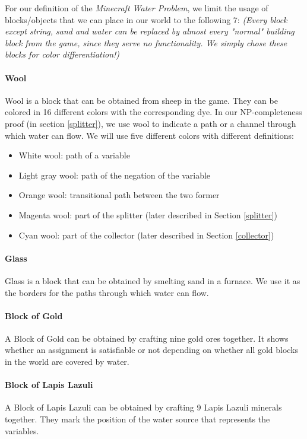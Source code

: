 \noindent For our definition of the \textit{Minecraft Water Problem}, we limit the usage of blocks/objects that we can place in our world to the following 7:
\newline \textit{(Every block except string, sand and water can be replaced by almost every "normal" building block from the game, since they serve no functionality. We simply chose these blocks for color differentiation!)}
\paragraph{Wool\cite{minecraftfandom:wool}}
Wool is a block that can be obtained from sheep in the game.
They can be colored in 16 different colors with the corresponding dye.
In our NP-completeness proof (in section \ref{splitter}), we use wool to indicate a path or a channel through which water can flow.
We will use five different colors with different definitions:
\begin{itemize}
    \item White wool: path of a variable
    \item Light gray wool: path of the negation of the variable
    \item Orange wool: transitional path between the two former
    \item Magenta wool: part of the splitter (later described in Section \ref{splitter})
    \item Cyan wool: part of the collector (later described in Section \ref{collector})
\end{itemize}

\paragraph{Glass\cite{minecraftfandom:glass}}
Glass is a block that can be obtained by smelting sand in a furnace.
We use it as the borders for the paths through which water can flow.

\paragraph{Block of Gold\cite{minecraftfandom:bog}}
A Block of Gold can be obtained by crafting nine gold ores together.
\newline It shows whether an assignment is satisfiable or not depending on whether all gold blocks in the world are covered by water.

\paragraph{Block of Lapis Lazuli\cite{minecraftfandom:boll}}
A Block of Lapis Lazuli can be obtained by crafting 9 Lapis Lazuli minerals together.
They mark the position of the water source that represents the variables.

